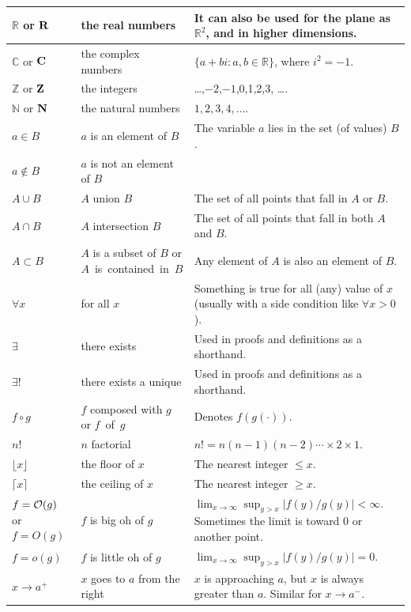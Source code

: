 \begin{tabular}{|p{0.8in}|p{1.6in}|p{3.15in}|}
$ \mathbb{R} $ or ${\bf R}$ & the real numbers 
		&It can also be used for the plane as $\mathbb{R}^2$, and
  		in higher dimensions. \\ \hline
$ \mathbb{C} $ or ${\bf C}$ & the complex numbers 
		& $\{a+bi: a,b\in \mathbb{R} \}$, where $i^2=-1$. \\ \hline
$ \mathbb{Z} $ or ${\bf Z}$ & the integers 
		& \ldots,$-2$,$-1$,0,1,2,3, \ldots. \\ \hline
$ \mathbb{N} $ or ${\bf N}$ & the natural numbers 
		&  $1,2,3,4, \ldots$. \\ \hline
$ a\in B$ & $a$ is an element of $B$
		& The variable $a$ lies in the set  (of values) $B$. \\ \hline
$a\notin B$ & $a$ is not an element of $B$ & \\ \hline
$A \cup B$ & $A$ union $B$
		& The set of all points that fall in $A$ or $B$.\\ \hline
$A \cap B$ & $A$ intersection $B$
		&The set of all points that fall in both $A$ and $B$.\\ \hline
$A \subset B$ & $A$ is a subset of $B$ or $A$~is~contained~in~$B$
	&Any element of $A$ is also an element of $B$.\\ \hline
$ \forall x$ & for all $x$& Something is true for all (any) value of $x$
	(usually with a side condition like $ \forall x>0$).  \\ \hline
$\exists$   &  there exists  
		&Used in proofs and definitions as a shorthand. \\ \hline
$\exists!$  & there exists a unique 
		&Used in proofs and definitions as a shorthand.\\ \hline
$ f\circ g$ & $f$ composed with $g$ or $f$~of~$g$
			& Denotes $f(g(\cdot))$. \\ \hline
$n!$ & $n$ factorial & $n!=n(n-1)(n-2)\cdots \times 2 \times 1$. \\ \hline
$ \lfloor x \rfloor$ &the floor of $x$ 
		& The nearest integer $\le x$. \\ \hline
$ \lceil x \rceil$ &the ceiling of $x$ 
		& The nearest integer $\ge x$. \\ \hline
$f={\cal O}(g)$ or $f=O(g)$	& $f$ is big oh of $g$
		& $\lim_{x\rightarrow\infty}\sup_{y>x} |f(y)/g(y)|<\infty$. 
		Sometimes the limit is toward $0$ or another point.
					\\ \hline
$f=o(g)$	& $f$ is little oh of $g$
		& $\lim_{x\rightarrow\infty}\sup_{y>x} |f(y)/g(y)|=0$.
					\\ \hline
$x\rightarrow a^+$	& $x$ goes to $a$ from the right
		& $x$ is approaching $a$, but $x$ is always greater than $a$.
			Similar for $x\rightarrow a^-$.\\ \hline
\end{tabular}
